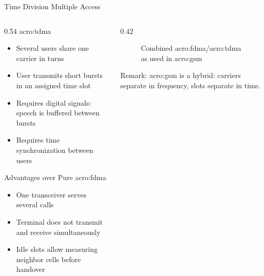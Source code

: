 \begin{frame}{Time Division Multiple Access}
  \begin{columns}[T,onlytextwidth]
    \begin{column}{0.54\textwidth}
      \Gls{acro:tdma}
      \begin{itemize}
        \item Several users share one carrier in turns
        \item User transmits short bursts in an assigned time slot
        \item Requires digital signals: speech is buffered between bursts
        \item Requires time synchronization between users
      \end{itemize}
      \vspace{0.4em}
      Advantages over Pure \gls{acro:fdma}
      \begin{itemize}
        \item One transceiver serves several calls
        \item Terminal does not transmit and receive simultaneously
        \item Idle slots allow measuring neighbor cells before handover
      \end{itemize}
    \end{column}
    \begin{column}{0.42\textwidth}
      \begin{figure}
        \centering
        
        \caption{Combined \gls{acro:fdma}/\gls{acro:tdma} as used in \gls{acro:gsm}}
      \end{figure}
      \alert{Remark:} \gls{acro:gsm} is a hybrid: carriers separate in frequency, slots separate in time.
    \end{column}
  \end{columns}
\end{frame}

